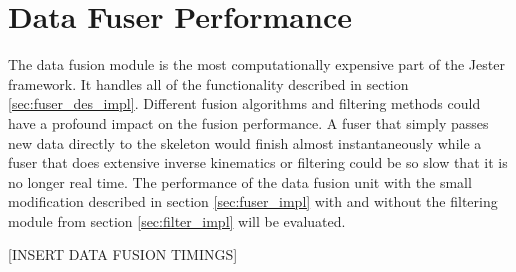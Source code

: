 \section{Data Fuser Performance}

The data fusion module is the most computationally expensive part of the Jester framework. It handles all of the functionality described in section \ref{sec:fuser_des_impl}. Different fusion algorithms and filtering methods could have a profound impact on the fusion performance. A fuser that simply passes new data directly to the skeleton would finish almost instantaneously while a fuser that does extensive inverse kinematics or filtering could be so slow that it is no longer real time. The performance of the data fusion unit with the small modification described in section \ref{sec:fuser_impl} with and without the filtering module from section \ref{sec:filter_impl} will be evaluated.

[INSERT DATA FUSION TIMINGS]
